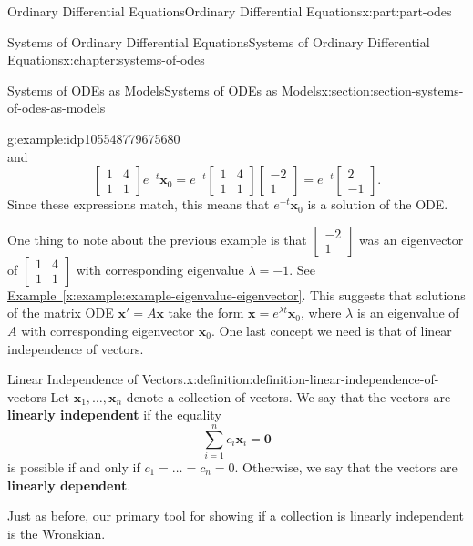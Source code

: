 \documentclass[oneside,10pt,]{book}
\newcommand{\xreffont}{\relax}
\newcommand{\terminology}[1]{\textbf{#1}}
\numberwithin{equation}{part}
\renewcommand{\vec}[1]{\mathbf{#1}}
\newcommand{\amp}{&}
\begin{document}
\begin{partptx}{Ordinary Differential Equations}{}{Ordinary Differential Equations}{}{}{x:part:part-odes}
\begin{chapterptx}{Systems of Ordinary Differential Equations}{}{Systems of Ordinary Differential Equations}{}{}{x:chapter:systems-of-odes}
\begin{sectionptx}{Systems of ODEs as Models}{}{Systems of ODEs as Models}{}{}{x:section:section-systems-of-odes-as-models}
\begin{example}{}{g:example:idp105548779675680}
\begin{equation*}
\end{equation*}
and%
\begin{equation*}
\begin{bmatrix}1\amp 4\\1\amp 1\end{bmatrix}e^{-t}\vec{x}_{0} = e^{-t}\begin{bmatrix}1\amp 4\\1\amp 1\end{bmatrix}\begin{bmatrix}-2\\1\end{bmatrix} = e^{-t}\begin{bmatrix}2\\-1\end{bmatrix}.
\end{equation*}
Since these expressions match, this means that \(e^{-t}\vec{x}_{0}\) is a solution of the ODE.%
\end{example}
One thing to note about the previous example is that \(\begin{bmatrix}-2\\1\end{bmatrix}\) was an eigenvector of \(\begin{bmatrix}1\amp 4\\1\amp 1\end{bmatrix}\) with corresponding eigenvalue \(\lambda=-1\). See \hyperref[x:example:example-eigenvalue-eigenvector]{Example~{\xreffont\ref{x:example:example-eigenvalue-eigenvector}}}. This suggests that solutions of the matrix ODE \(\vec{x}' = A\vec{x}\) take the form \(\vec{x} = e^{\lambda t}\vec{x}_{0}\), where \(\lambda\) is an eigenvalue of \(A\) with corresponding eigenvector \(\vec{x}_{0}\). One last concept we need is that of linear independence of vectors.%
\begin{definition}{Linear Independence of Vectors.}{x:definition:definition-linear-independence-of-vectors}%
%
Let \(\vec{x}_{1},\dots,\vec{x}_{n}\) denote a collection of vectors. We say that the vectors are \terminology{linearly independent} if the equality%
\begin{equation*}
\sum_{i=1}^{n}c_{i}\vec{x}_{i} = \vec{0}
\end{equation*}
is possible if and only if \(c_{1}=\dots=c_{n}=0\). Otherwise, we say that the vectors are \terminology{linearly dependent}.%
\end{definition}
Just as before, our primary tool for showing if a collection is linearly independent is the Wronskian.%

\end{sectionptx}
\end{chapterptx}
\end{partptx}
\end{document}
